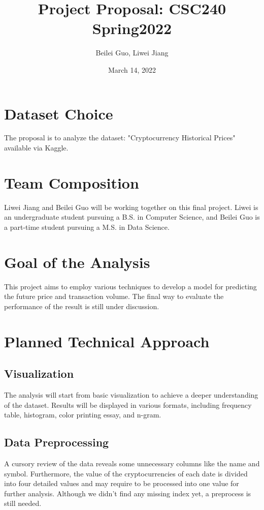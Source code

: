 \documentclass{spie}
\title{Project Proposal: CSC240 Spring2022}
\date{March 14, 2022}
\author{Beilei Guo, Liwei Jiang}
\begin{document}
\maketitle

\section{Dataset Choice}

The proposal is to analyze the dataset: "Cryptocurrency Historical Prices" available via Kaggle.

\section{Team Composition}

Liwei Jiang and Beilei Guo will be working together on this final project. Liwei is an undergraduate student pursuing a B.S. in Computer Science, and Beilei Guo is a part-time student pursuing a M.S. in Data Science.

\section{Goal of the Analysis}

This project aims to employ various techniques to develop a model for predicting the future price and transaction volume. The final way to evaluate the performance of the result is still under discussion.

\section{Planned Technical Approach}

\subsection{Visualization}

The analysis will start from basic visualization to achieve a deeper understanding of the dataset. Results will be displayed in various formats, including frequency table, histogram, color printing essay, and n-gram.

\subsection{Data Preprocessing}

A cursory review of the data reveals some unnecessary columns like the name and symbol. Furthermore, the value of the cryptocurrencies of each date is divided into four detailed values and may require to be processed into one value for further analysis. Although we didn't find any missing index yet, a preprocess is still needed.
\end{document}
